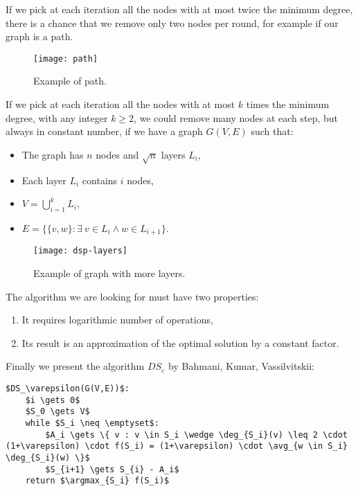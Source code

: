 \begin{ex}
    If we pick at each iteration all the nodes with at most twice the minimum degree, there is a chance that we remove only two nodes per round, for example if our graph is a path.
    \begin{figure}[h!]
        \centering
        \texttt{[image: path]}
        \caption{Example of path.}
        \label{fig:dsp-path}
    \end{figure}
\end{ex}


\begin{ex}
    If we pick at each iteration all the nodes with at most $k$ times the minimum degree, with any integer $k \geq 2$, we could remove many nodes at each step, but always in constant number, if we have a graph $G(V,E)$ such that:
    \begin{itemize}
        \item The graph has $n$ nodes and $\sqrt{n}$ layers $L_i$,
        \item Each layer $L_i$ contains $i$ nodes,
        \item $V = \bigcup_{i=1}^k L_i$,
        \item $E = \{ \{v,w\} : \exists\ v \in L_i \wedge w \in L_{i+1} \}$.
    \end{itemize}
    \begin{figure}[h!]
        \centering
        \texttt{[image: dsp-layers]}
        \caption{Example of graph with more layers.}
        \label{fig:dsp-layers}
    \end{figure}
\end{ex}

\begin{obs}
    The algorithm we are looking for must have two properties:
    \begin{enumerate}
        \item It requires logarithmic number of operations,
        \item Its result is an approximation of the optimal solution by a constant factor.
    \end{enumerate}
\end{obs}

Finally we present the algorithm $DS_\varepsilon$ by Bahmani, Kumar, Vassilvitskii:
\begin{lstlisting}[caption={The $DS_\varepsilon$ algorithm to solve the densest subgraph problem},label={lst:dsp-dse}]
$DS_\varepsilon(G(V,E))$:
    $i \gets 0$
    $S_0 \gets V$
    while $S_i \neq \emptyset$:
        $A_i \gets \{ v : v \in S_i \wedge \deg_{S_i}(v) \leq 2 \cdot (1+\varepsilon) \cdot f(S_i) = (1+\varepsilon) \cdot \avg_{w \in S_i} \deg_{S_i}(w) \}$
        $S_{i+1} \gets S_{i} - A_i$
    return $\argmax_{S_i} f(S_i)$
\end{lstlisting}

